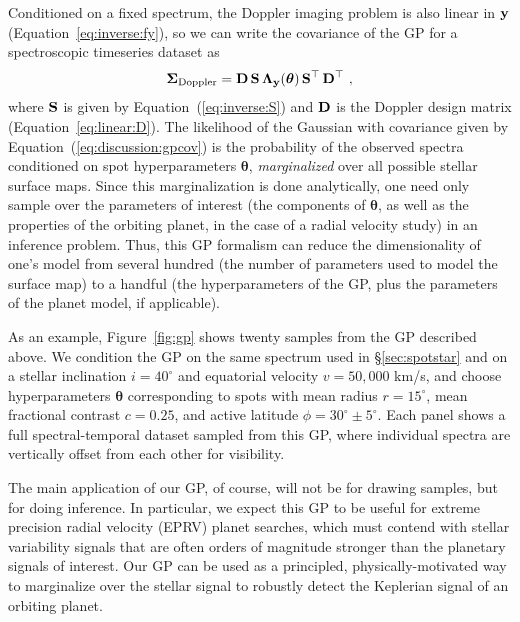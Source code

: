 \documentclass[modern]{aastex631}
\begin{document}
Conditioned on a fixed spectrum, the Doppler imaging problem is also linear in ${\mathbf{y}}$ (Equation~\ref{eq:inverse:fy}), so we can write the covariance of the GP for a spectroscopic timeseries dataset as
%
\begin{align}
    \label{eq:discussion:gpcov}
    \boldsymbol{\Sigma}_\mathrm{Doppler} = \mathbf{D} \, \mathbf{S} \, \boldsymbol{\Lambda}_{\mathbf{y}} (\boldsymbol{\theta}) \, \mathbf{S}^\top \, \mathbf{D}^\top
    \hskip 0.33em,
\end{align}
%
where ${\mathbf{S}}$ is given by Equation~(\ref{eq:inverse:S}) and ${\mathbf{D}}$ is the Doppler design matrix (Equation~\ref{eq:linear:D}).
The likelihood of the Gaussian with covariance given by Equation~(\ref{eq:discussion:gpcov}) is the probability of the observed spectra conditioned on spot hyperparameters $\boldsymbol{\theta}$, \emph{marginalized} over all possible stellar surface maps.
Since this marginalization is done analytically, one need only sample over the parameters of interest (the components of $\boldsymbol{\theta}$, as well as the properties of the orbiting planet, in the case of a radial velocity study) in an inference problem.
Thus, this GP formalism can reduce the dimensionality of one's model from several hundred (the number of parameters used to model the surface map) to a handful (the hyperparameters of the GP, plus the parameters of the planet model, if applicable).

As an example, Figure~\ref{fig:gp} shows twenty samples from the GP described above. 
We condition the GP on the same spectrum used in \S\ref{sec:spotstar} and on a stellar inclination $i = 40^\circ$ and equatorial velocity $v = 50{,}000$ km/s, and choose hyperparameters $\boldsymbol{\theta}$ corresponding to spots with mean radius $r = 15^\circ$, mean fractional contrast $c = 0.25$, and active latitude $\phi = 30^\circ \pm 5^\circ$.
Each panel shows a full spectral-temporal dataset sampled from this GP, where individual spectra are vertically offset from each other for visibility.

The main application of our GP, of course, will not be for drawing samples, but for doing inference. 
In particular, we expect this GP to be useful for extreme precision radial velocity (EPRV) planet searches, which must contend with stellar variability signals that are often orders of magnitude stronger than the planetary signals of interest.
Our GP can be used as a principled, physically-motivated way to marginalize over the stellar signal to robustly detect the Keplerian signal of an orbiting planet.
\end{document}

